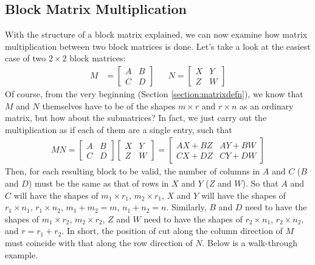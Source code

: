 \subsection{Block Matrix Multiplication}

With the structure of a block matrix explained, we can now examine how matrix multiplication between two block matrices is done. Let's take a look at the easiest case of two $2 \times 2$ block matrices:
\begin{align*}
M &=
\begin{bmatrix}
A & B \\
C & D
\end{bmatrix} 
& &
N =
\begin{bmatrix}
X & Y \\
Z & W
\end{bmatrix} 
\end{align*}
Of course, from the very beginning (Section \ref{section:matrixdefn}), we know that $M$ and $N$ themselves have to be of the shapes $m \times r$ and $r \times n$ as an ordinary matrix, but how about the submatrices? In fact, we just carry out the multiplication as if each of them are a single entry, such that
\begin{align*}
MN = 
\begin{bmatrix}
A & B \\
C & D
\end{bmatrix} 
\begin{bmatrix}
X & Y \\
Z & W
\end{bmatrix} 
=
\begin{bmatrix}
AX + BZ & AY + BW \\
CX + DZ & CY + DW
\end{bmatrix}
\end{align*}
Then, for each resulting block to be valid, the number of columns in $A$ and $C$ ($B$ and $D$) must be the same as that of rows in $X$ and $Y$ ($Z$ and $W$). So that $A$ and $C$ will have the shapes of $m_1 \times r_1$, $m_2 \times r_1$, $X$ and $Y$ will have the shapes of $r_1 \times n_1$, $r_1 \times n_2$, $m_1 + m_2 = m$, $n_1 + n_2 = n$. Similarly, $B$ and $D$ need to have the shapes of $m_1 \times r_2$, $m_2 \times r_2$, $Z$ and $W$ need to have the shapes of $r_2 \times n_1$, $r_2 \times n_2$, and $r = r_1 + r_2$. In short, the position of cut along the column direction of $M$ must coincide with that along the row direction of $N$. Below is a walk-through example.

